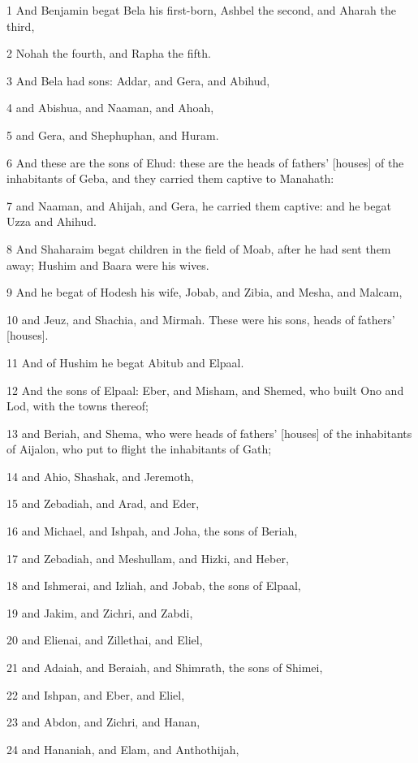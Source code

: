 \par 1 And Benjamin begat Bela his first-born, Ashbel the second, and Aharah the third,
\par 2 Nohah the fourth, and Rapha the fifth.
\par 3 And Bela had sons: Addar, and Gera, and Abihud,
\par 4 and Abishua, and Naaman, and Ahoah,
\par 5 and Gera, and Shephuphan, and Huram.
\par 6 And these are the sons of Ehud: these are the heads of fathers' [houses] of the inhabitants of Geba, and they carried them captive to Manahath:
\par 7 and Naaman, and Ahijah, and Gera, he carried them captive: and he begat Uzza and Ahihud.
\par 8 And Shaharaim begat children in the field of Moab, after he had sent them away; Hushim and Baara were his wives.
\par 9 And he begat of Hodesh his wife, Jobab, and Zibia, and Mesha, and Malcam,
\par 10 and Jeuz, and Shachia, and Mirmah. These were his sons, heads of fathers' [houses].
\par 11 And of Hushim he begat Abitub and Elpaal.
\par 12 And the sons of Elpaal: Eber, and Misham, and Shemed, who built Ono and Lod, with the towns thereof;
\par 13 and Beriah, and Shema, who were heads of fathers' [houses] of the inhabitants of Aijalon, who put to flight the inhabitants of Gath;
\par 14 and Ahio, Shashak, and Jeremoth,
\par 15 and Zebadiah, and Arad, and Eder,
\par 16 and Michael, and Ishpah, and Joha, the sons of Beriah,
\par 17 and Zebadiah, and Meshullam, and Hizki, and Heber,
\par 18 and Ishmerai, and Izliah, and Jobab, the sons of Elpaal,
\par 19 and Jakim, and Zichri, and Zabdi,
\par 20 and Elienai, and Zillethai, and Eliel,
\par 21 and Adaiah, and Beraiah, and Shimrath, the sons of Shimei,
\par 22 and Ishpan, and Eber, and Eliel,
\par 23 and Abdon, and Zichri, and Hanan,
\par 24 and Hananiah, and Elam, and Anthothijah,
